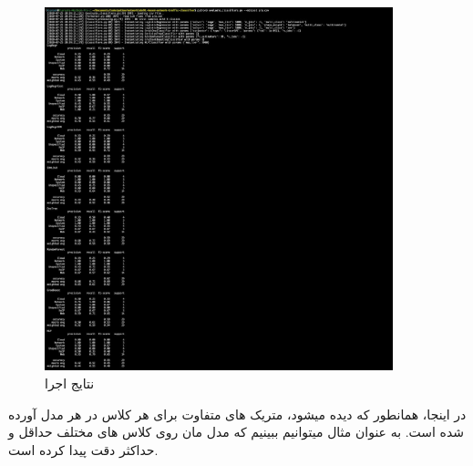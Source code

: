 \begin{figure}[h]
	\centering
	\includegraphics[width=0.9\textwidth]{training/9}
	\caption{نتایج اجرا}
	\label{fig:training:results}
\end{figure} 

در اینجا، همانطور که دیده میشود، متریک های متفاوت برای هر کلاس در هر مدل آورده شده است. به عنوان مثال میتوانیم ببینیم که مدل 
مان روی کلاس های مختلف حداقل 
 و حداکثر
 دقت پیدا کرده است. 
